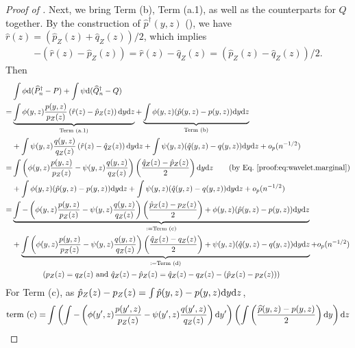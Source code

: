\documentclass{article}
\theoremstyle{plain}
\theoremstyle{definition}
\def\PP{P}
\def\QQ{Q}
\theoremstyle{plain}
\newcommand{\diff}{{\rm d}}
\begin{document}
\begin{proof}[Proof of ]
Next, we bring Term (b), Term (a.1), as well as the counterparts for $Q$ together.
By the construction of $\hat p^\dagger(y,z)$ (), we have $\hat r(z)
  = \left(\hat p_Z(z) + \hat q_Z(z)\right) / 2$, which implies \begin{align}\label{proof:eq:wavelet.marginal}
  -(\hat r(z) -\hat p_Z(z)) = \hat r(z) -\hat q_Z(z) = (\hat p_Z(z) -\hat q_Z(z))/2.
  \end{align}
Then
\begin{align*}
    &\int \phi \diff (\widehat P_n^{\dagger} - \PP) + \int \psi \diff (\widehat Q_n^{\dagger} - \QQ)\\
    =& \underbrace{\int \phi(y,z) \frac{p(y,z)}{p_Z(z)} \left(\hat r(z) -\hat p_Z(z)\right) \diff y\diff z}_{\text{Term (a.1)}} + \underbrace{\int \phi(y,z) (\hat p(y,z) - p(y,z)) \diff y \diff z}_{\text{Term (b)}}  \\
    &+  \int \psi(y,z) \frac{q(y,z)}{q_Z(z)} \left(\hat r(z) -\hat q_Z(z)\right) \diff y\diff z + \int \psi(y,z) (\hat q(y,z) - q(y,z)) \diff y \diff z + o_p(n^{-1/2})\\
    = &  \int \left(\phi(y,z) \frac{p(y,z)}{p_Z(z)}-\psi(y,z) \frac{q(y,z)}{q_Z(z)}\right) \left(\frac{\hat q_Z(z) -\hat p_Z(z)}{2}\right)\diff y\diff z \qquad (\text{by Eq.~\eqref{proof:eq:wavelet.marginal}})\\
    &+ \int \phi(y,z) (\hat p(y,z) - p(y,z)) \diff y \diff z + \int \psi(y,z) (\hat q(y,z) - q(y,z)) \diff y \diff z + o_p(n^{-1/2}) \\
   =& \underbrace{\int -\left(\phi(y,z) \frac{p(y,z)}{p_Z(z)}-\psi(y,z) \frac{q(y,z)}{q_Z(z)}\right) \left(\frac{\hat p_Z(z) - p_Z(z)}{2}\right) + \phi(y,z) (\hat p(y,z) - p(y,z))  \diff y\diff z}_{:=\text{Term (c)}} \\
   &+\underbrace{\int \left(\phi(y,z) \frac{p(y,z)}{p_Z(z)}-\psi(y,z) \frac{q(y,z)}{q_Z(z)}\right) \left(\frac{\hat q_Z(z) - q_Z(z)}{2}\right) + \psi(y,z) (\hat q(y,z) - q(y,z))  \diff y\diff z}_{:=\text{Term (d)}}+ o_p(n^{-1/2})\\
    &\quad \quad \quad \quad (p_Z(z)=q_Z(z)~\text{and}~\hat q_Z(z) - \hat p_Z(z)=\hat q_Z(z) - q_Z(z) - (\hat p_Z(z) - p_Z(z)))\\
\end{align*}
For Term (c), as $\hat p_Z(z) - p_Z(z) = \int \hat p(y,z) - p(y,z) \diff y \diff z$,
\begin{align*}
    \text{term (c)}
     =& \int \left(\int -\left(\phi(y',z) \frac{p(y',z)}{p_Z(z)}-\psi(y',z) \frac{q(y',z)}{q_Z(z)}\right) \diff y'\right) \left(\int \left(\frac{\widehat   p(y, z) - p(y,z)}{2}\right) \diff y \right) \diff z\\

\end{align*}
\end{proof}
\end{document}
